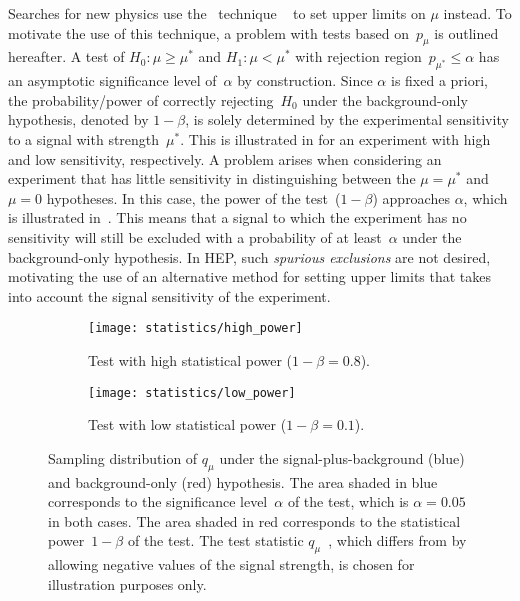 Searches for new physics use the \CLs~technique
~\cite{Junk:1999kv,Read:2000ru,Read:2002hq} to set upper limits on $\mu$
instead. To motivate the use of this technique, a problem with tests based
on~$p_\mu$ is outlined hereafter. A test of $H_0: \mu \geq \mu^*$ and
$H_1: \mu < \mu^*$ with rejection region~$p_{\mu^*} \leq \alpha$ has an
asymptotic significance level of~$\alpha$ by construction.
Since $\alpha$ is fixed a priori, the probability/power of correctly
rejecting~$H_0$ under the background-only hypothesis, denoted by $1 - \beta$, is
solely determined by the experimental sensitivity to a signal with
strength~$\mu^*$. This is illustrated in
 for an experiment with high
and low sensitivity, respectively. A problem arises when considering an
experiment that has little sensitivity in distinguishing between the
$\mu = \mu^*$ and $\mu = 0$ hypotheses. In this case, the power of the
test~($1 - \beta$) approaches $\alpha$, which is illustrated
in~. This means that a signal to which the experiment
has no sensitivity will still be excluded with a probability of at
least~$\alpha$ under the background-only hypothesis. In HEP, such \emph{spurious
  exclusions} are not desired, motivating the use of an alternative method for
setting upper limits that takes into account the signal sensitivity of the
experiment.

\begin{figure}[htbp]
  \centering

  \begin{subfigure}{0.46\textwidth}
    \texttt{[image: statistics/high\_power]}
    \caption{Test with high statistical power ($1 - \beta = 0.8$).}%
    \label{fig:cls_qmu_highpower}
  \end{subfigure}\hfill%
  \begin{subfigure}{0.46\textwidth}
    \texttt{[image: statistics/low\_power]}
    \caption{Test with low statistical power ($1 - \beta = 0.1$).}%
    \label{fig:cls_qmu_lowpower}
  \end{subfigure}

  \caption[Sampling distribution of the test statistic for upper limits under
  the signal-plus-background and background-only hypothesis.]{Sampling
    distribution of $q_{\mu}$ under the signal-plus-background (blue) and
    background-only (red) hypothesis. The area shaded in blue corresponds to the
    significance level~$\alpha$ of the test, which is $\alpha = 0.05$ in both
    cases. The area shaded in red corresponds to the statistical
    power~$1 - \beta$ of the test. The test statistic
    $q_{\mu}$~\cite{Cowan:2010js}, which differs from \qmutilde by allowing
    negative values of the signal strength, is chosen for illustration purposes
    only.}%
  \label{fig:cls_qmu}
\end{figure}

